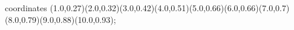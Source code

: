 					coordinates { (1.0,0.27)(2.0,0.32)(3.0,0.42)(4.0,0.51)(5.0,0.66)(6.0,0.66)(7.0,0.7)(8.0,0.79)(9.0,0.88)(10.0,0.93)};